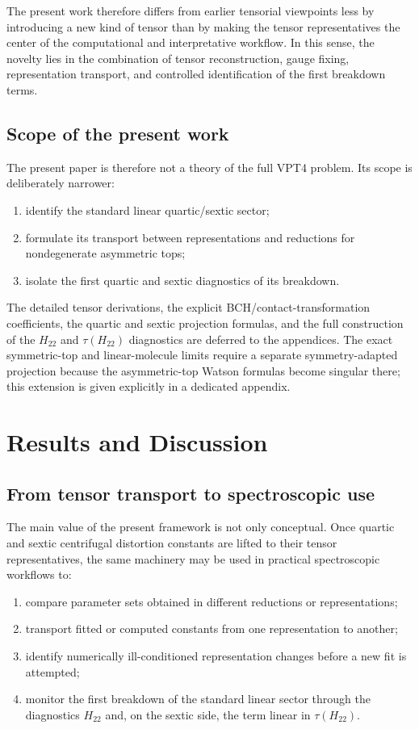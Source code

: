\documentclass[journal=jacsat,manuscript=article]{achemso}
\begin{document}
The present work therefore differs from earlier tensorial viewpoints
less by introducing a new kind of tensor than by making the tensor
representatives the center of the computational and interpretative
workflow. In this sense, the novelty lies in the combination of
tensor reconstruction, gauge fixing, representation transport, and
controlled identification of the first breakdown terms.

\subsection{Scope of the present work}

The present paper is therefore not a theory of the full VPT4 problem.
Its scope is deliberately narrower:
\begin{enumerate}
\item identify the standard linear quartic/sextic sector;
\item formulate its transport between representations and reductions for
nondegenerate asymmetric tops;
\item isolate the first quartic and sextic diagnostics of its breakdown.
\end{enumerate}

The detailed tensor derivations, the explicit BCH/contact-transformation
coefficients, the quartic and sextic projection formulas, and the full
construction of the $H_{22}$ and $\tau(H_{22})$ diagnostics are
deferred to the appendices.
The exact symmetric-top and linear-molecule limits require a separate
symmetry-adapted projection because the asymmetric-top Watson formulas become
singular there; this extension is given explicitly in a dedicated appendix.


\section{Results and Discussion}

\subsection{From tensor transport to spectroscopic use}

The main value of the present framework is not only conceptual. Once quartic
and sextic centrifugal distortion constants are lifted to their tensor
representatives, the same machinery may be used in practical spectroscopic
workflows to:
\begin{enumerate}
\item compare parameter sets obtained in different reductions or
representations;
\item transport fitted or computed constants from one representation to
another;
\item identify numerically ill-conditioned representation changes before a new
fit is attempted;
\item monitor the first breakdown of the standard linear sector through the
diagnostics $H_{22}$ and, on the sextic side, the term linear in
$\tau(H_{22})$.
\end{enumerate}
\end{document}

